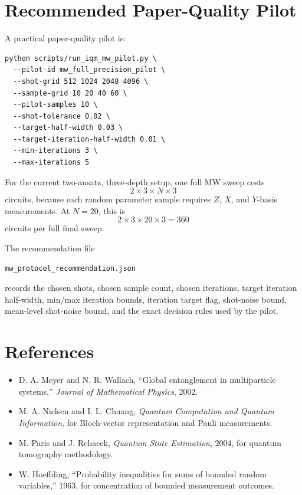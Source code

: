 \documentclass[11pt]{article}
\begin{document}
\section{Recommended Paper-Quality Pilot}

A practical paper-quality pilot is:
\begin{verbatim}
python scripts/run_iqm_mw_pilot.py \
  --pilot-id mw_full_precision_pilot \
  --shot-grid 512 1024 2048 4096 \
  --sample-grid 10 20 40 60 \
  --pilot-samples 10 \
  --shot-tolerance 0.02 \
  --target-half-width 0.03 \
  --target-iteration-half-width 0.01 \
  --min-iterations 3 \
  --max-iterations 5
\end{verbatim}

For the current two-ansatz, three-depth setup, one full MW sweep costs
\begin{equation}
2 \times 3 \times N \times 3
\end{equation}
circuits, because each random parameter sample requires \(Z\), \(X\), and
\(Y\)-basis measurements. At \(N=20\), this is
\begin{equation}
2 \times 3 \times 20 \times 3 = 360
\end{equation}
circuits per full final sweep.

The recommendation file
\begin{verbatim}
mw_protocol_recommendation.json
\end{verbatim}
records the chosen shots, chosen sample count, chosen iterations,
target iteration half-width, min/max iteration bounds, iteration target flag,
shot-noise bound, mean-level shot-noise bound, and the exact decision rules
used by the pilot.

\section{References}

\begin{itemize}
  \item D. A. Meyer and N. R. Wallach, ``Global entanglement in multiparticle
  systems,'' \emph{Journal of Mathematical Physics}, 2002.
  \item M. A. Nielsen and I. L. Chuang, \emph{Quantum Computation and Quantum
  Information}, for Bloch-vector representation and Pauli measurements.
  \item M. Paris and J. Rehacek, \emph{Quantum State Estimation}, 2004, for
  quantum tomography methodology.
  \item W. Hoeffding, ``Probability inequalities for sums of bounded random
  variables,'' 1963, for concentration of bounded measurement outcomes.
\end{itemize}
\end{document}
